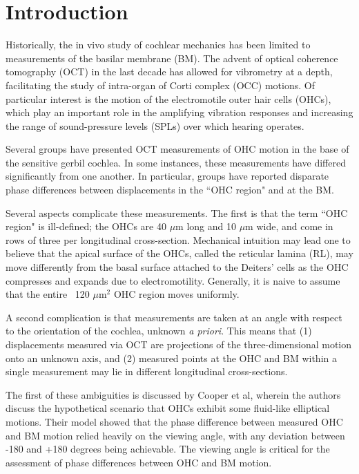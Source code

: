 \documentclass[aip,cp,amsmath,amssymb,reprint]{revtex4-2}
\begin{document}
\section{\label{sec:intro}Introduction}
\par{Historically, the in vivo study of cochlear mechanics has been limited to measurements of the basilar membrane (BM). The advent of optical coherence tomography (OCT) in the last decade has allowed for vibrometry at a depth, facilitating the study of intra-organ of Corti complex (OCC) motions. Of particular interest is the motion of the electromotile outer hair cells (OHCs), which play an important role in the amplifying vibration responses and increasing the range of sound-pressure levels (SPLs) over which hearing operates.}
\par{Several groups have presented OCT measurements of OHC motion in the base of the sensitive gerbil cochlea. In some instances, these measurements have differed significantly from one another. In particular, groups have reported disparate phase differences between displacements in the ``OHC region" and at the BM.}
\par{Several aspects complicate these measurements. The first is that the term ``OHC region" is ill-defined; the OHCs are 40 $\mu$m long and 10 $\mu$m wide, and come in rows of three per longitudinal cross-section. Mechanical intuition may lead one to believe that the apical surface of the OHCs, called the reticular lamina (RL), may move differently from the basal surface attached to the Deiters' cells as the OHC compresses and expands due to electromotility. Generally, it is naive to assume that the entire ~120 $\mu$m$^2$ OHC region moves uniformly.}
\par{A second complication is that measurements are taken at an angle with respect to the orientation of the cochlea, unknown \textit{a priori}. This means that (1) displacements measured via OCT are projections of the three-dimensional motion onto an unknown axis, and (2) measured points at the OHC and BM within a single measurement may lie in different longitudinal cross-sections.}
\par{The first of these ambiguities is discussed by Cooper et al, wherein the authors discuss the hypothetical scenario that OHCs exhibit some fluid-like elliptical motions\cite{cooper2018}. Their model showed that the phase difference between measured OHC and BM motion relied heavily on the viewing angle, with any deviation between -180 and +180 degrees being achievable. The viewing angle is critical for the assessment of phase differences between OHC and BM motion.}
\end{document}
